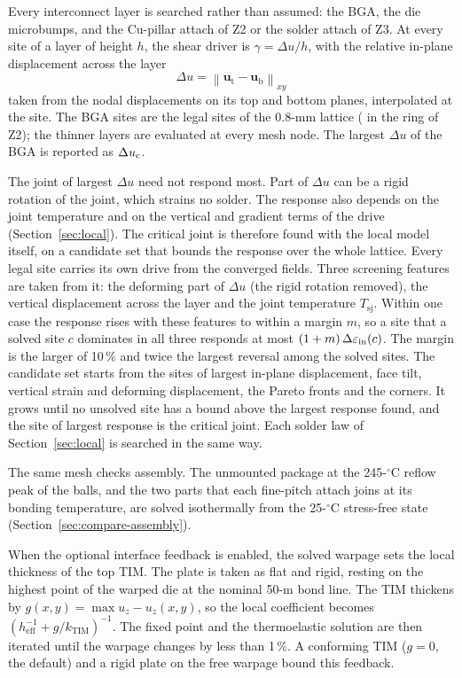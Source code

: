 Every interconnect layer is searched rather than assumed: the BGA, the die microbumps, and the
Cu-pillar attach of Z2 or the solder attach of Z3. At every site of a layer of height $h$, the
shear driver is $\gamma = \Delta u/h$, with the relative in-plane displacement across the layer
\begin{equation}
\Delta u = \left\| \mathbf{u}_{\mathrm{t}} - \mathbf{u}_{\mathrm{b}} \right\|_{xy}
\label{eq:du}
\end{equation}
taken from the nodal displacements on its top and bottom planes, interpolated at the site. The
BGA sites are the \MthSitesFull{} legal sites of the 0.8-mm lattice (\MthSitesRing{} in the ring
of Z2); the thinner layers are evaluated at every mesh node. The largest $\Delta u$ of the BGA is
reported as $\Delta u_{\mathrm{c}}$.

The joint of largest $\Delta u$ need not respond most. Part of $\Delta u$ can be a rigid rotation
of the joint, which strains no solder. The response also depends on the joint temperature and on
the vertical and gradient terms of the drive (Section~\ref{sec:local}). The critical joint is
therefore found with the local model itself, on a candidate set that bounds the response over the
whole lattice. Every legal site carries its own drive from the converged fields. Three
screening features are taken from it: the deforming part of $\Delta u$ (the rigid rotation
removed), the vertical displacement across the layer and the joint temperature $T_{\mathrm{sj}}$.
Within one case the response rises with these features to within a margin $m$, so a site that a
solved site $c$ dominates in all three responds at most $(1+m)\,\Delta\varepsilon_{\mathrm{in}}(c)$. The margin is the
larger of 10\,\% and twice the largest reversal among the solved sites. The candidate set starts
from the sites of largest in-plane displacement, face tilt, vertical strain and deforming
displacement, the Pareto fronts and the corners. It grows until no unsolved site has a bound above
the largest response found, and the site of largest response is the critical joint. Each solder
law of Section~\ref{sec:local} is searched in the same way.

The same mesh checks assembly. The unmounted package at the 245-$^\circ$C reflow peak of the
balls, and the two parts that each fine-pitch attach joins at its bonding temperature, are solved
isothermally from the 25-$^\circ$C stress-free state (Section~\ref{sec:compare-assembly}).

When the optional interface feedback is enabled, the solved warpage sets the local thickness of
the top TIM. The plate is taken as flat and rigid, resting on the highest point of the warped
die at the nominal 50-\textmu m bond line. The TIM thickens by $g(x,y) = \max u_z - u_z(x,y)$,
so the local coefficient becomes $(h_{\mathrm{eff}}^{-1} + g/k_{\mathrm{TIM}})^{-1}$. The fixed
point and the thermoelastic solution are then iterated until the warpage changes by less than
1\,\%. A conforming TIM ($g = 0$, the default) and a rigid plate on the free warpage
bound this feedback.

